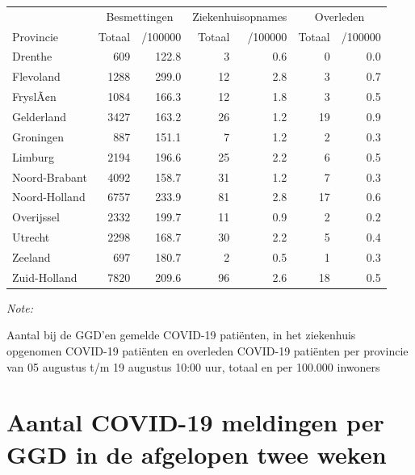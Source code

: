 \documentclass[
  english,
  man,floatsintext]{apa6}
\begin{document}
\begin{table}
\centering
\begin{threeparttable}
\begin{tabular}{lrrrrrr}
\toprule
\multicolumn{1}{c}{ } & \multicolumn{2}{c}{Besmettingen} & \multicolumn{2}{c}{Ziekenhuisopnames} & \multicolumn{2}{c}{Overleden} \\
\cmidrule(l{3pt}r{3pt}){2-3} \cmidrule(l{3pt}r{3pt}){4-5} \cmidrule(l{3pt}r{3pt}){6-7}
Provincie & Totaal & /100000 & Totaal & /100000 & Totaal & /100000\\
\midrule
Drenthe & 609 & 122.8 & 3 & 0.6 & 0 & 0.0\\
Flevoland & 1288 & 299.0 & 12 & 2.8 & 3 & 0.7\\
FryslÃ¢n & 1084 & 166.3 & 12 & 1.8 & 3 & 0.5\\
Gelderland & 3427 & 163.2 & 26 & 1.2 & 19 & 0.9\\
Groningen & 887 & 151.1 & 7 & 1.2 & 2 & 0.3\\
Limburg & 2194 & 196.6 & 25 & 2.2 & 6 & 0.5\\
Noord-Brabant & 4092 & 158.7 & 31 & 1.2 & 7 & 0.3\\
Noord-Holland & 6757 & 233.9 & 81 & 2.8 & 17 & 0.6\\
Overijssel & 2332 & 199.7 & 11 & 0.9 & 2 & 0.2\\
Utrecht & 2298 & 168.7 & 30 & 2.2 & 5 & 0.4\\
Zeeland & 697 & 180.7 & 2 & 0.5 & 1 & 0.3\\
Zuid-Holland & 7820 & 209.6 & 96 & 2.6 & 18 & 0.5\\
\bottomrule
\end{tabular}
\begin{tablenotes}
\item \textit{Note: } 
\item Aantal bij de GGD’en gemelde COVID-19 patiënten, in het ziekenhuis opgenomen COVID-19 patiënten en overleden COVID-19 patiënten per provincie van 05 augustus t/m 19 augustus 10:00 uur, totaal en per 100.000 inwoners
\end{tablenotes}
\end{threeparttable}
\end{table}

\newpage

\hypertarget{aantal-covid-19-meldingen-per-ggd-in-de-afgelopen-twee-weken}{%
\section{Aantal COVID-19 meldingen per GGD in de afgelopen twee weken}\label{aantal-covid-19-meldingen-per-ggd-in-de-afgelopen-twee-weken}}
\end{document}
